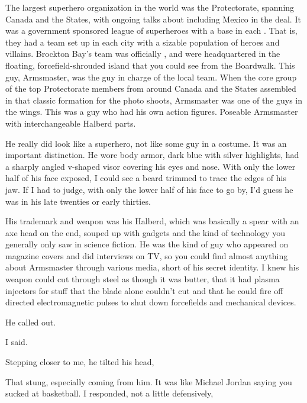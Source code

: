 The largest superhero organization in the world was the Protectorate, spanning Canada and the States, with ongoing talks about including Mexico in the deal. It was a government sponsored league of superheroes with a base in each . That is, they had a team set up in each city with a sizable population of heroes and villains. Brockton Bay's team was officially , and were headquartered in the floating, forcefield-shrouded island that you could see from the Boardwalk. This guy, Armsmaster, was the guy in charge of the local team. When the core group of the top Protectorate members from around Canada and the States assembled in that classic  formation for the photo shoots, Armsmaster was one of the guys in the wings. This was a guy who had his own action figures. Poseable Armsmaster with interchangeable Halberd parts.

He really did look like a superhero, not like some guy in a costume. It was an important distinction. He wore body armor, dark blue with silver highlights, had a sharply angled v-shaped visor covering his eyes and nose. With only the lower half of his face exposed, I could see a beard trimmed to trace the edges of his jaw. If I had to judge, with only the lower half of his face to go by, I'd guess he was in his late twenties or early thirties.

His trademark and weapon was his Halberd, which was basically a spear with an axe head on the end, souped up with gadgets and the kind of technology you generally only saw in science fiction. He was the kind of guy who appeared on magazine covers and did interviews on TV, so you could find almost anything about Armsmaster through various media, short of his secret identity. I knew his weapon could cut through steel as though it was butter, that it had plasma injectors for stuff that the blade alone couldn't cut and that he could fire off directed electromagnetic pulses to shut down forcefields and mechanical devices.

 He called out.

 I said.

Stepping closer to me, he tilted his head, 

That stung, especially coming from him. It was like Michael Jordan saying you sucked at basketball.  I responded, not a little defensively, 

